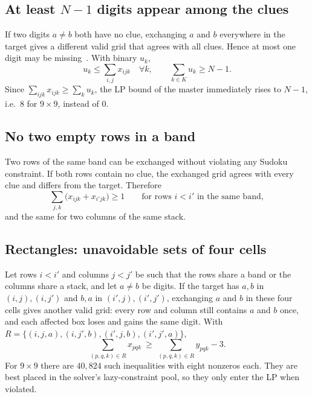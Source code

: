 \documentclass[11pt]{article}
\newcommand{\clue}{x}
\newcommand{\target}{y}
\begin{document}
\subsection{At least $N-1$ digits appear among the clues}

If two digits $a\ne b$ both have no clue, exchanging $a$ and $b$ everywhere in the target gives a different valid grid that agrees with all clues. Hence at most one digit may be missing~\cite{mcguire}. With binary $u_k$,
\begin{equation}
u_k\le\sum_{i,j}\clue_{ijk}\quad\forall k,
\qquad
\sum_{k\in K}u_k\ge N-1.
\label{eq:digit-cover}
\end{equation}
Since $\sum_{ijk}\clue_{ijk}\ge\sum_k u_k$, the LP bound of the master immediately rises to $N-1$, i.e.\ $8$ for $9\times9$, instead of $0$.

\subsection{No two empty rows in a band}

Two rows of the same band can be exchanged without violating any Sudoku constraint. If both rows contain no clue, the exchanged grid agrees with every clue and differs from the target. Therefore
\begin{equation}
\sum_{j,k}\bigl(\clue_{ijk}+\clue_{i'jk}\bigr)\ge1
\qquad\text{for rows } i<i' \text{ in the same band},
\label{eq:row-pairs}
\end{equation}
and the same for two columns of the same stack.

\subsection{Rectangles: unavoidable sets of four cells}

Let rows $i<i'$ and columns $j<j'$ be such that the rows share a band or the columns share a stack, and let $a\ne b$ be digits. If the target has $a,b$ in $(i,j),(i,j')$ and $b,a$ in $(i',j),(i',j')$, exchanging $a$ and $b$ in these four cells gives another valid grid: every row and column still contains $a$ and $b$ once, and each affected box loses and gains the same digit. With $R=\{(i,j,a),(i,j',b),(i',j,b),(i',j',a)\}$,
\begin{equation}
\sum_{(p,q,k)\in R}\clue_{pqk}\ \ge\ \sum_{(p,q,k)\in R}\target_{pqk}-3.
\label{eq:rectangles}
\end{equation}
For $9\times9$ there are $40{,}824$ such inequalities with eight nonzeros each. They are best placed in the solver's lazy-constraint pool, so they only enter the LP when violated.
\end{document}
